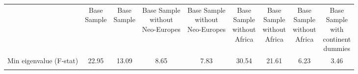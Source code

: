 \begin{center}
\begin{tabular}{lcccccccc}
\hline \noalign{\smallskip} & \shortstack{Base\\Sample} & \shortstack{Base\\Sample} & \shortstack{Base Sample\\without\\Neo-Europes} & \shortstack{Base Sample\\without\\Neo-Europes} & \shortstack{Base\\Sample\\without\\Africa} & \shortstack{Base\\Sample\\without\\Africa} & \shortstack{Base\\Sample\\without\\Africa} & \shortstack{Base\\Sample\\with\\continent\\dummies}\\
\noalign{\smallskip}\hline \noalign{\smallskip}Min eigenvalue (F-stat) & 22.95 & 13.09 & 8.65 & 7.83 & 30.54 & 21.61 & 6.23 & 3.46\\
\noalign{\smallskip}\hline\end{tabular}\\
\end{center}
